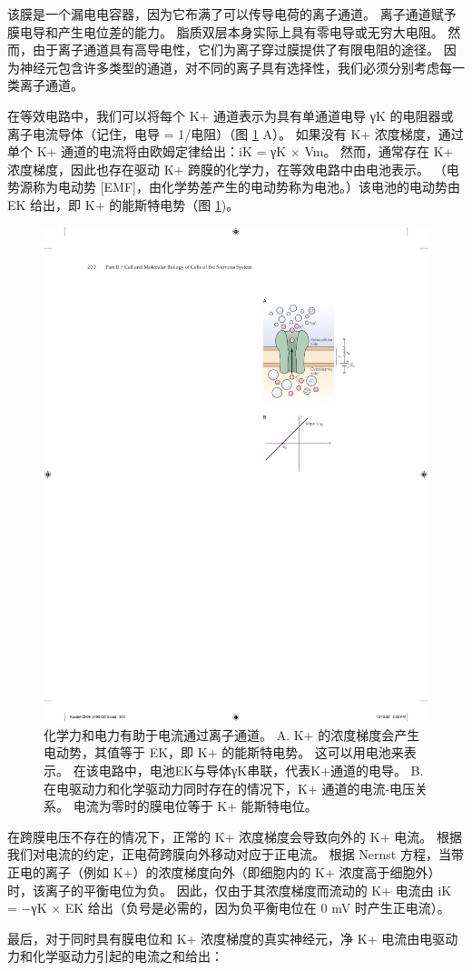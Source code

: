 该膜是一个漏电电容器，因为它布满了可以传导电荷的离子通道。 
离子通道赋予膜电导和产生电位差的能力。 
脂质双层本身实际上具有零电导或无穷大电阻。 
然而，由于离子通道具有高导电性，它们为离子穿过膜提供了有限电阻的途径。 
因为神经元包含许多类型的通道，对不同的离子具有选择性，我们必须分别考虑每一类离子通道。


在等效电路中，我们可以将每个 K+ 通道表示为具有单通道电导 γK 的电阻器或离子电流导体（记住，电导 = 1/电阻）（图 \ref{fig:9_6} A）。 
如果没有 K+ 浓度梯度，通过单个 K+ 通道的电流将由欧姆定律给出：iK = γK × Vm。 
然而，通常存在 K+ 浓度梯度，因此也存在驱动 K+ 跨膜的化学力，在等效电路中由电池表示。 
（电势源称为电动势 [EMF]，由化学势差产生的电动势称为电池。）该电池的电动势由 EK 给出，即 K+ 的能斯特电势（图 \ref{fig:9_6})。

\begin{figure}[htbp]
	\centering
	\includegraphics[width=0.5\linewidth]{chap09/fig_9_6}
	\caption{化学力和电力有助于电流通过离子通道。 A. K+ 的浓度梯度会产生电动势，其值等于 EK，即 K+ 的能斯特电势。 这可以用电池来表示。 在该电路中，电池EK与导体γK串联，代表K+通道的电导。 B. 在电驱动力和化学驱动力同时存在的情况下，K+ 通道的电流-电压关系。 电流为零时的膜电位等于 K+ 能斯特电位。}
	\label{fig:9_6}
\end{figure}


在跨膜电压不存在的情况下，正常的 K+ 浓度梯度会导致向外的 K+ 电流。 
根据我们对电流的约定，正电荷跨膜向外移动对应于正电流。 
根据 Nernst 方程，当带正电的离子（例如 K+）的浓度梯度向外（即细胞内的 K+ 浓度高于细胞外）时，该离子的平衡电位为负。 
因此，仅由于其浓度梯度而流动的 K+ 电流由 iK = −γK × EK 给出（负号是必需的，因为负平衡电位在 0 mV 时产生正电流）。


最后，对于同时具有膜电位和 K+ 浓度梯度的真实神经元，净 K+ 电流由电驱动力和化学驱动力引起的电流之和给出：


